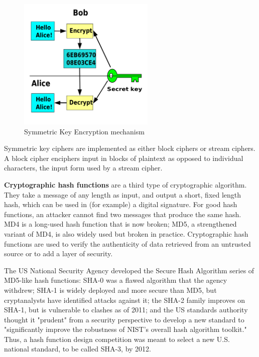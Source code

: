\documentclass[a4paper]{article}
\begin{document}
    \begin{figure}[H]
      \centering
      \includegraphics[height=2.5in]{../ref/symmetrickey.png}
      \caption{Symmetric Key Encryption mechanism}
      \label{fig:symmetrickey}
    \end{figure}
    
    Symmetric key ciphers are implemented as either block ciphers or stream ciphers. 
    A block cipher enciphers input in blocks of plaintext as opposed to individual characters, 
    the input form used by a stream cipher.

    {\bfseries Cryptographic hash functions} are a third type of cryptographic algorithm. 
    They take a message of any length as input, and output a short, fixed length hash, which 
    can be used in (for example) a digital signature. For good hash functions, an attacker 
    cannot find two messages that produce the same hash. MD4 is a long-used hash function 
    that is now broken; MD5, a strengthened variant of MD4, is also widely used but broken 
    in practice. Cryptographic hash functions are used 
    to verify the authenticity of data retrieved from an untrusted source or to add a layer 
    of security.
    
    The US National Security Agency developed the Secure Hash Algorithm series of MD5-like 
    hash functions: SHA-0 was a flawed algorithm that the agency withdrew; SHA-1 is widely 
    deployed and more secure than MD5, but cryptanalysts have identified attacks against it; 
    the SHA-2 family improves on SHA-1, but is vulnerable to clashes as of 2011; and the US 
    standards authority thought it "prudent" from a security perspective to develop a new 
    standard to "significantly improve the robustness of NIST's overall hash algorithm toolkit."
    \cite{neuralhash}
    Thus, a hash function design competition was meant to select a new U.S. national standard, 
    to be called SHA-3, by 2012. 
    
\end{document}
